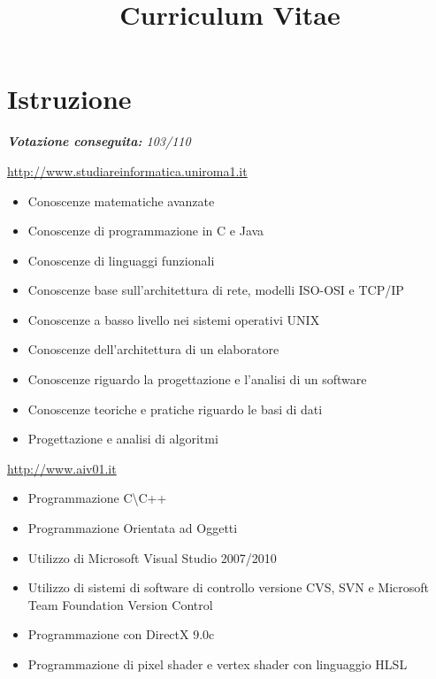 \documentclass[11pt,a4paper,sans]{moderncv} %
\title{Curriculum Vitae}
\begin{document}

\makecvtitle %


\section{Istruzione}


{
	\newline{}
	\textit{\textbf{Votazione conseguita:} 103/110}
}
{
	\url{http://www.studiareinformatica.uniroma1.it}
	\begin{itemize}
		\item Conoscenze matematiche avanzate
		\item Conoscenze di programmazione in C e Java
		\item Conoscenze di linguaggi funzionali
		\item Conoscenze base sull'architettura di rete, modelli ISO-OSI e TCP/IP
		\item Conoscenze a basso livello nei sistemi operativi UNIX
		\item Conoscenze dell'architettura di un elaboratore
		\item Conoscenze riguardo la progettazione e l'analisi di un software
		\item Conoscenze teoriche e pratiche riguardo le basi di dati
		\item Progettazione e analisi di algoritmi
	\end{itemize}
}


{
	\url{http://www.aiv01.it}
	\begin{itemize}
		\item Programmazione C\textbackslash C++
		\item Programmazione Orientata ad Oggetti
		\item Utilizzo di Microsoft Visual Studio 2007/2010
		\item Utilizzo di sistemi di software di controllo versione CVS, SVN e Microsoft Team Foundation Version Control
		\item Programmazione con DirectX 9.0c
		\item Programmazione di pixel shader e vertex shader con linguaggio HLSL
	\end{itemize}
}
\end{document}
